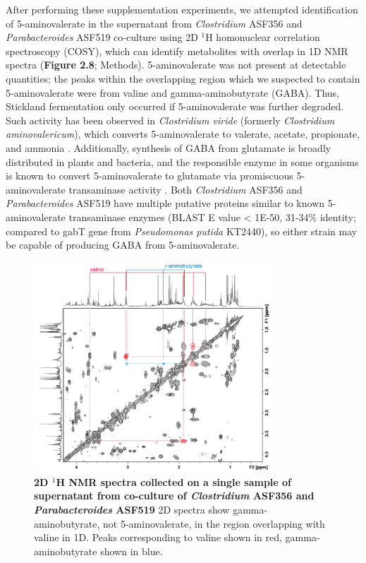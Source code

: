 \documentclass[11pt,twocolumn,notitlepage,openany,twoside]{book}
\begin{document}
\begin{refsection}
After performing these supplementation experiments, we attempted identification of 5-aminovalerate in the supernatant from \textit{Clostridium} ASF356 and \textit{Parabacteroides} ASF519 co-culture using 2D $^1\!$H homonuclear correlation spectroscopy (COSY), which can identify metabolites with overlap in 1D NMR spectra (\textbf{Figure 2.8}; Methods). 5-aminovalerate was not present at detectable quantities; the peaks within the overlapping region which we suspected to contain 5-aminovalerate were from valine and gamma-aminobutyrate (GABA). Thus, Stickland fermentation only occurred if 5-aminovalerate was further degraded. Such activity has been observed in \textit{Clostridium viride} (formerly \textit{Clostridium aminovalericum}), which converts 5-aminovalerate to valerate, acetate, propionate, and ammonia \cite{Barker1985-rs,Barker1987-jt}. Additionally, synthesis of GABA from glutamate is broadly distributed in plants and bacteria, and the responsible enzyme in some organisms is known to convert 5-aminovalerate to glutamate via promiscuous 5-aminovalerate transaminase activity \cite{Shin2016-vy,Yonaha1985-xp}. Both \textit{Clostridium} ASF356 and \textit{Parabacteroides} ASF519 have multiple putative proteins similar to known 5-aminovalerate transaminase enzymes (BLAST E value < 1E-50, 31-34\% identity; compared to gabT gene from \textit{Pseudomonas putida} KT2440), so either strain may be capable of producing GABA from 5-aminovalerate.

\begin{figure}[tb]
\centering
\includegraphics[width=0.8\textwidth]{ch2_figS5}
\caption[2D $^1\!$H NMR spectra collected on a single sample of supernatant from co-culture of \textit{Clostridium} ASF356 and \textit{Parabacteroides} ASF519]{\textbf{2D $^1\!$H NMR spectra collected on a single sample of supernatant from co-culture of \textit{Clostridium} ASF356 and \textit{Parabacteroides} ASF519} 2D spectra show gamma-aminobutyrate, not 5-aminovalerate, in the region overlapping with valine in 1D. Peaks corresponding to valine shown in red, gamma-aminobutyrate shown in blue.}
\end{figure}


\end{refsection}
\end{document}
